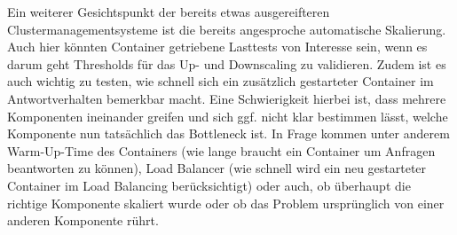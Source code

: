 Ein weiterer Gesichtspunkt der bereits etwas ausgereifteren Clustermanagementsysteme ist die bereits angesproche automatische Skalierung.
Auch hier k\"onnten Container getriebene Lasttests von Interesse sein, wenn es darum geht Thresholds f\"ur das Up- und Downscaling zu validieren.
Zudem ist es auch wichtig zu testen, wie schnell sich ein zus\"atzlich gestarteter Container im Antwortverhalten bemerkbar macht.
Eine Schwierigkeit hierbei ist, dass mehrere Komponenten ineinander greifen und sich ggf. nicht klar bestimmen l\"asst, welche Komponente nun tats\"achlich das \glqq{}Bottleneck\grqq{} ist. In Frage kommen unter anderem Warm-Up-Time des Containers (wie lange braucht ein Container um Anfragen beantworten zu k\"onnen), Load Balancer (wie schnell wird ein neu gestarteter Container im Load Balancing ber\"ucksichtigt) oder auch, ob \"uberhaupt die richtige Komponente skaliert wurde oder ob das Problem urspr\"unglich von einer anderen Komponente r\"uhrt.
